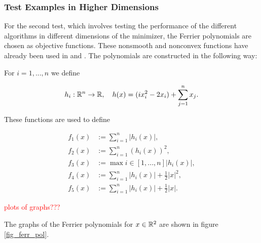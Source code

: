 \subsubsection{Test Examples in Higher Dimensions}

For the second test, which involves testing the performance of the different algorithms in different dimensions of the minimizer, the Ferrier polynomials are chosen as objective functions. These nonsmooth and nonconvex functions have already been used in \cite{Hare2010} and \cite{Hare2016}. The polynomials are constructed in the following way:

For \(i = 1,...,n\) we define 

\begin{align*}
	h_i: \mathbb{R}^n \to \mathbb{R}, \quad h(x) = (ix_i^2-2x_i)+\sum_{j=1}^n x_j.
\end{align*}

These functions are used to define

\begin{align*}
	f_1(x) &:= \sum_{i=1}^n |h_i(x)|, \\
	f_2(x) &:= \sum_{i=1}^n (h_i(x))^2, \\
	f_3(x) &:= \max{i \in [1,...,n]}|h_i(x)|, \\
	f_4(x) &:= \sum_{i=1}^n |h_i(x)|+\frac{1}{2}|x|^2, \\
	f_5(x) &:= \sum_{i=1}^n |h_i(x)|+\frac{1}{2}|x|.
\end{align*}

\textcolor{red}{plots of graphs???}

The graphs of the Ferrier polynomials for \(x \in \mathbb{R}^2\) are shown in figure \ref{fig_ferr_pol}.

